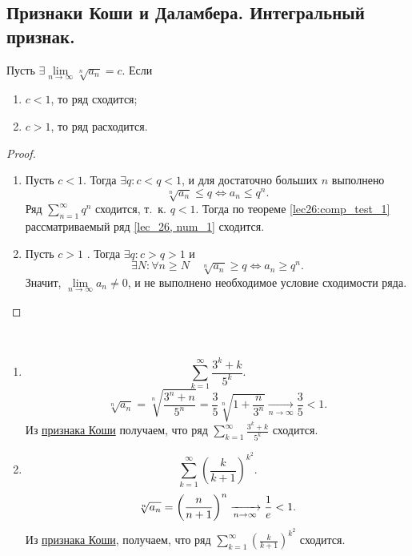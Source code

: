 \documentclass[../../main.tex]{subfiles}
\begin{document}
	\subsection{Признаки Коши и Даламбера. Интегральный признак.}
	
	\begin{thm}\label{lec27:cauchy} 	
		Пусть $\exists \lim\limits_{n \to \infty } \sqrt[n]{a_n}  = c$. Если
	\begin{enumerate}[label={\alph*)}]
			\item $c < 1$, то ряд сходится;
			\item $c > 1$, то ряд расходится.
	\end{enumerate}
	\end{thm}
	\begin{proof}
		
		~
		
	\begin{enumerate}[label={\alph*)}]
		 \item Пусть $c < 1$. Тогда $\exists q: c < q < 1$, и для достаточно больших $n$ выполнено
			\[ \sqrt[n]{a_n} \leq q \iff a_n \leq q^n. \]
			Ряд $\sum\limits_{n=1}^{\infty} q^n$ сходится, т.~к. $q < 1$. Тогда по 
			теореме \ref{lec26:comp_test_1}
			рассматриваемый ряд \eqref{lec_26, num_1} сходится.
			 
		\item Пусть $c>1$ . Тогда $\exists q : c > q > 1 $ и \[\exists N : \forall n \geq N \quad
			 \sqrt[n]{a_n} \geq q \iff a_n \geq q^n.\] Значит, $\lim\limits_{n \to \infty} a_n 
			 \neq 0$, и не выполнено необходимое условие сходимости ряда. \qedhere
	\end{enumerate}
	\end{proof}

	\begin{examples}

	~

	\begin{enumerate}
	 \item
		\[ \sum_{k=1}^{\infty}  \frac{3^k + k}{5^k}.  \]
		\[ \sqrt[n]{a_n} = \sqrt[n]{\frac{3^n + n}{5^n}} = \frac{3}{5} \sqrt[n]{1 + 
		\frac{n}{3^n}}  \underset{n \rightarrow \infty}
		{\longrightarrow} \frac{3}{5} < 1.    \]
		Из \hyperref[lec27:cauchy]{признака Коши} получаем, что ряд  
		$\sum\limits_{k=1}^{\infty}  \frac{3^k + k}{5^k}$
		сходится.
	\item
		\[ \sum_{k=1}^{\infty} \left( \frac{k}{k+1}\right) ^{k^2}. \]
		\[ \sqrt[n]{a_n} =  \left( \frac{n}{n+1}\right) ^n  \xrightarrow[n \rightarrow 
		\infty]{} \frac{1}{e} < 1. \]
		Из \hyperref[lec27:cauchy]{признака Коши}, получаем, что ряд 
		$\sum\limits_{k=1}^{\infty} \left( \frac{k}{k+1}\right) ^{k^2}$ сходится.
	\end{enumerate}
	\end{examples} 	
\end{document}
